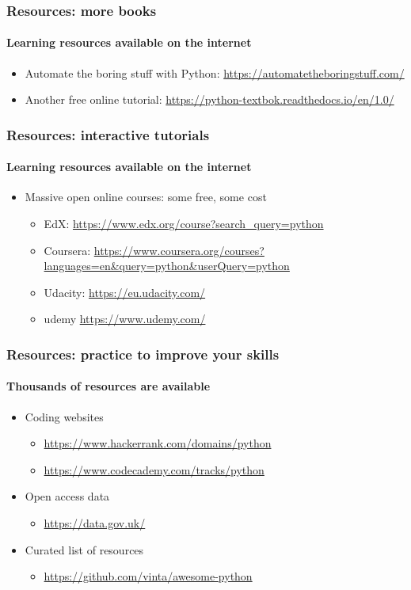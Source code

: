 \documentclass{beamer}
\begin{document}
       \begin{frame}
	       \frametitle{Resources: more books}
	       \framesubtitle{Learning resources available on the internet}
	       \begin{itemize}
		       \item Automate the boring stuff with Python: \url{https://automatetheboringstuff.com/}
		       \item Another free online tutorial: \url{https://python-textbok.readthedocs.io/en/1.0/}
	       \end{itemize}
       \end{frame}


    \begin{frame}
	    \frametitle{Resources: interactive tutorials}
	    \framesubtitle{Learning resources available on the internet}
	    \begin{itemize}
		    \item Massive open online courses: some free, some cost
			    \begin{itemize}
				    \item EdX: \url{https://www.edx.org/course?search_query=python}
				    \item Coursera: \url{https://www.coursera.org/courses?languages=en&query=python&userQuery=python}
				    \item Udacity: \url{https://eu.udacity.com/}
				    \item udemy \url{https://www.udemy.com/}
			    \end{itemize}
	    \end{itemize}
    \end{frame}

    \begin{frame}
	    \frametitle{Resources: practice to improve your skills}
	    \framesubtitle{Thousands of resources are available}
	    \begin{itemize}
		    \item Coding websites
			    \begin{itemize}
				    \item \url{https://www.hackerrank.com/domains/python}
				    \item \url{https://www.codecademy.com/tracks/python}
			    \end{itemize}
		    \item Open access data
			    \begin{itemize}
				    \item \url{https://data.gov.uk/}
			    \end{itemize}
		    \item Curated list of resources
			    \begin{itemize}
				    \item \url{https://github.com/vinta/awesome-python}
			    \end{itemize}
	    \end{itemize}
    \end{frame}
\end{document}
